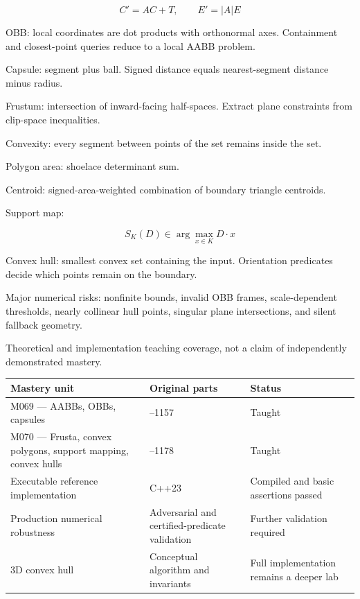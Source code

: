 \[
\boxed{C'=AC+T,\qquad E'=|A|E}
\]

OBB: local coordinates are dot products with orthonormal axes. Containment and closest-point queries reduce to a local AABB problem.

Capsule: segment plus ball. Signed distance equals nearest-segment distance minus radius.

Frustum: intersection of inward-facing half-spaces. Extract plane constraints from clip-space inequalities.

Convexity: every segment between points of the set remains inside the set.

Polygon area: shoelace determinant sum.

Centroid: signed-area-weighted combination of boundary triangle centroids.

Support map:

\[
\boxed{S_K(D)\in\arg\max_{x\in K}D\cdot x}
\]

Convex hull: smallest convex set containing the input. Orientation predicates decide which points remain on the boundary.

Major numerical risks: nonfinite bounds, invalid OBB frames, scale-dependent thresholds, nearly collinear hull points, singular plane intersections, and silent fallback geometry.

Theoretical and implementation teaching coverage, not a claim of independently demonstrated mastery.

{\def\LTcaptype{none} %
\begin{longtable}[]{@{}
  >{\raggedright\arraybackslash}p{}
  >{\raggedright\arraybackslash}p{}
  >{\raggedright\arraybackslash}p{}@{}}
\toprule\noalign{}
\begin{minipage}[b]{\linewidth}\raggedright
Mastery unit
\end{minipage} & \begin{minipage}[b]{\linewidth}\raggedright
Original parts
\end{minipage} & \begin{minipage}[b]{\linewidth}\raggedright
Status
\end{minipage} \\
\midrule\noalign{}
\endhead
\bottomrule\noalign{}
\endlastfoot
M069 --- AABBs, OBBs, capsules & 1133--1157 & Taught \\
M070 --- Frusta, convex polygons, support mapping, convex hulls & 1158--1178 & Taught \\
Executable reference implementation & C++23 & Compiled and basic assertions passed \\
Production numerical robustness & Adversarial and certified-predicate validation & Further validation required \\
3D convex hull & Conceptual algorithm and invariants & Full implementation remains a deeper lab \\
\end{longtable}
}


